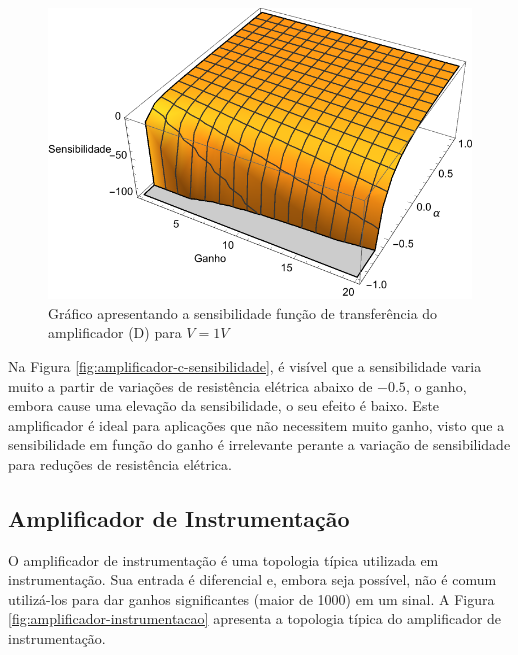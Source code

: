 \documentclass[a4paper]{instrumentacao}
\begin{document}
\begin{figure}[H]
\center
\includegraphics[width=\textwidth]{Amplificador-D-Sensibility.pdf}
\caption{Gráfico apresentando a sensibilidade função de transferência do amplificador (D) para $V=1V$}
\label{fig:amplificador-d-sensibilidade}
\end{figure}

Na Figura \ref{fig:amplificador-c-sensibilidade}, é visível que a sensibilidade varia muito a partir de variações de resistência elétrica abaixo de $-0.5$, o ganho, embora cause uma elevação da sensibilidade, o seu efeito é baixo. Este amplificador é ideal para aplicações que não necessitem muito ganho, visto que a sensibilidade em função do ganho é irrelevante perante a variação de sensibilidade para reduções de resistência elétrica.


\subsection{Amplificador de Instrumentação}

O amplificador de instrumentação é uma topologia típica utilizada em instrumentação. Sua entrada é diferencial e, embora seja possível, não é comum utilizá-los para dar ganhos significantes (maior de 1000) em um sinal. A Figura \ref{fig:amplificador-instrumentacao} apresenta a topologia típica do amplificador de instrumentação.
\end{document}
